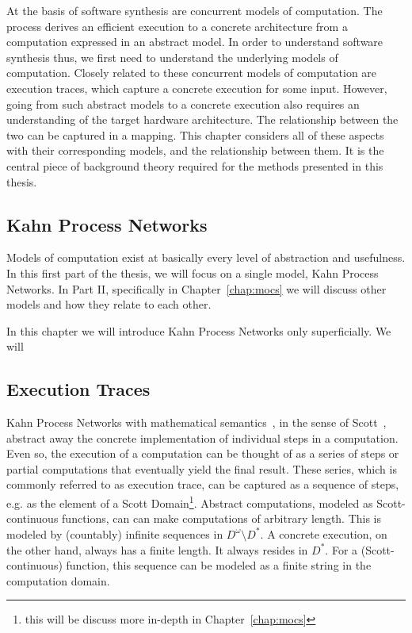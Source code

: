 At the basis of software synthesis are concurrent models of computation. The process derives an efficient execution to a concrete architecture from a computation expressed in an abstract model.
In order to understand software synthesis thus, we first need to understand the underlying models of computation.
Closely related to these concurrent models of computation are execution traces, which capture a concrete execution for some input.
However, going from such abstract models to a concrete execution also requires an understanding of the target hardware architecture.
The relationship between the two can be captured in a mapping.
This chapter considers all of these aspects with their corresponding models, and the relationship between them.
It is the central piece of background theory required for the methods presented in this thesis.

\subsection{Kahn Process Networks}

Models of computation exist at basically every level of abstraction and usefulness. In this first part of the thesis, we will focus on a single model, Kahn Process Networks.
In Part II, specifically in Chapter~\ref{chap:mocs} we will discuss other models and how they relate to each other.


In this chapter we will introduce Kahn Process Networks only superficially. We will 
\subsection{Execution Traces}
Kahn Process Networks with mathematical semantics~\cite{kahn74}, in the sense of Scott~\cite{scott1970}, abstract away the concrete implementation of individual steps in a computation.
Even so, the execution of a computation can be thought of as a series of steps or partial computations that eventually yield the final result.
These series, which is commonly referred to as execution trace, can be captured as a sequence of steps, e.g. as the element of a Scott Domain\footnote{this will be discuss more in-depth in Chapter~\ref{chap:mocs}}. 
Abstract computations, modeled as Scott-continuous functions, can can make computations of arbitrary length.
This is modeled by (countably) infinite sequences in $D^\omega \setminus D^*$.
A concrete execution, on the other hand, always has a finite length.
It always resides in $D^*$.
For a (Scott-continuous) function, this sequence can be modeled as a finite string in the computation domain.

